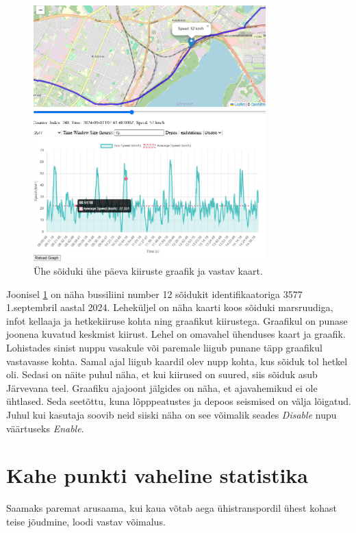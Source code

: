 \begin{figure}[h]
    \centering
    \includegraphics[width=0.8\textwidth]{figures/speedgraphDepos.png}
    \caption{Ühe sõiduki ühe päeva kiiruste graafik ja vastav kaart.}
    \label{fig:KiirusedGraafik}
\end{figure}

Joonisel \ref{fig:KiirusedGraafik} on näha bussiliini number 12 sõidukit identifikaatoriga 3577 1.septembril aastal 2024. Leheküljel on näha kaarti koos sõiduki marsruudiga, infot kellaaja ja hetkekiiruse kohta ning graafikut kiirustega. Graafikul on punase joonena kuvatud keskmist kiirust. 
Lehel on omavahel ühenduses kaart ja graafik. Lohistades sinist nuppu vasakule või paremale liigub punane täpp graafikul vastavasse kohta. Samal ajal liigub kaardil olev nupp kohta, kus sõiduk tol hetkel oli. Sedasi on näite puhul näha, et kui kiirused on suured, siis sõiduk asub Järvevana teel. Graafiku ajajoont jälgides on näha, et ajavahemikud ei ole ühtlased. Seda seetõttu, kuna lõpppeatustes ja depoos seismised on välja lõigatud. Juhul kui kasutaja soovib neid siiski näha on see võimalik seades \textit{Disable} nupu väärtuseks \textit{Enable}.


\section{Kahe punkti vaheline statistika} 

Saamaks paremat arusaama, kui kaua võtab aega ühistranspordil ühest kohast teise jõudmine, loodi vastav võimalus.

